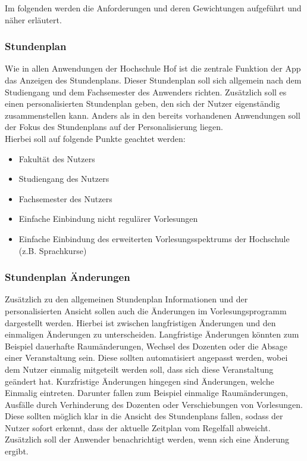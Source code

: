 Im folgenden werden die Anforderungen und deren Gewichtungen aufgeführt und näher erläutert.

\subsubsection{Stundenplan}

Wie in allen Anwendungen der Hochschule Hof ist die zentrale Funktion der \ac{App} das Anzeigen des Stundenplans. Dieser Stundenplan soll sich allgemein nach dem Studiengang und dem Fachsemester des Anwenders richten. Zusätzlich soll es einen personalisierten Stundenplan geben, den sich der Nutzer eigenständig zusammenstellen kann. Anders als in den bereits vorhandenen Anwendungen soll der Fokus des Stundenplans auf der Personalisierung liegen. 
\\
\linebreak
Hierbei soll auf folgende Punkte geachtet werden:

\begin{itemize}
	\item Fakultät des Nutzers
	\item Studiengang des Nutzers
	\item Fachsemester des Nutzers
	\item Einfache Einbindung nicht regulärer Vorlesungen
	\item Einfache Einbindung des erweiterten Vorlesungsspektrums der Hochschule (z.B. Sprachkurse)
\end{itemize}

\subsubsection{Stundenplan Änderungen}

Zusätzlich zu den allgemeinen Stundenplan Informationen und der personalisierten Ansicht sollen auch die Änderungen im Vorlesungsprogramm dargestellt werden. Hierbei ist zwischen langfristigen Änderungen und den einmaligen Änderungen zu unterscheiden. Langfristige Änderungen könnten zum Beispiel dauerhafte Raumänderungen, Wechsel des Dozenten oder die Absage einer Veranstaltung sein. Diese sollten automatisiert angepasst werden, wobei dem Nutzer einmalig mitgeteilt werden soll, dass sich diese Veranstaltung geändert hat. Kurzfristige Änderungen hingegen sind Änderungen, welche Einmalig eintreten. Darunter fallen zum Beispiel einmalige Raumänderungen, Ausfälle durch Verhinderung des Dozenten oder Verschiebungen von Vorlesungen. Diese sollten möglich klar in die Ansicht des Stundenplans fallen, sodass der Nutzer sofort erkennt, dass der aktuelle Zeitplan vom Regelfall abweicht. Zusätzlich soll der Anwender benachrichtigt werden, wenn sich eine Änderung ergibt.

